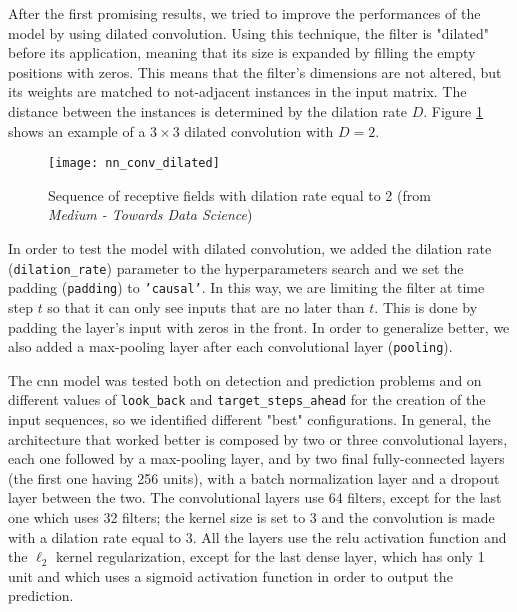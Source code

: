 After the first promising results, we tried to improve the performances of the model by using dilated convolution. Using this technique, the filter is "dilated" before its application, meaning that its size is expanded by filling the empty positions with zeros. This means that the filter's dimensions are not altered, but its weights are matched to not-adjacent instances in the input matrix. The distance between the instances is determined by the dilation rate $D$. Figure \ref{fig:nn_conv_dilated} shows an example of a $3 \times 3$ dilated convolution with $D=2$.
\begin{figure}[htbp]
    \centering
    \texttt{[image: nn\_conv\_dilated]}
    \caption{Sequence of receptive fields with dilation rate equal to 2 (from \textit{Medium - Towards Data Science})}
    \label{fig:nn_conv_dilated}
\end{figure}

In order to test the model with dilated convolution, we added the dilation rate (\texttt{dilation\_rate}) parameter to the hyperparameters search and we set the padding (\texttt{padding}) to \texttt{'causal'}. In this way, we are limiting the filter at time step $t$ so that it can only see inputs that are no later than $t$. This is done by padding the layer's input with zeros in the front. In order to generalize better, we also added a max-pooling layer after each convolutional layer (\texttt{pooling}).

The \acs{cnn} model was tested both on detection and prediction problems and on different values of \texttt{look\_back} and \texttt{target\_steps\_ahead} for the creation of the input sequences, so we identified different "best" configurations. In general, the architecture that worked better is composed by two or three convolutional layers, each one followed by a max-pooling layer, and by two final fully-connected layers (the first one having 256 units), with a batch normalization layer and a dropout layer between the two. The convolutional layers use 64 filters, except for the last one which uses 32 filters; the kernel size is set to 3 and the convolution is made with a dilation rate equal to 3. All the layers use the \acs{relu} activation function and the $\ell_2$ kernel regularization, except for the last dense layer, which has only 1 unit and which uses a sigmoid activation function in order to output the prediction. 

